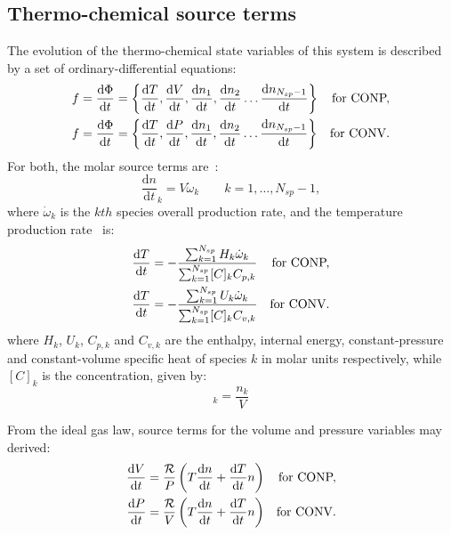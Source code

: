 \documentclass[12pt]{article}
\newcommand{\ns}{N_{sp}}
\newcommand{\conp}{CONP}
\newcommand{\conv}{CONV}
\newcommand{\dconp}{\ifmmode\text{for \conp,}\else for \conp,\fi}
\newcommand{\dconv}{\ifmmode\text{for \conv,}\else for \conv.\fi}
\newcommand{\Ru}{\mathcal{R}}
\begin{document}
\subsection{Thermo-chemical source terms}
The evolution of the thermo-chemical state variables of this system is described by a set of ordinary-differential equations:
\begin{subequations}
\label{e:source_terms}
\begin{align}
f &= \frac{\text{d} \Phi }{\text{d} t } = \left\{\frac{\text{d} T }{\text{d} t },\frac{\text{d} V }{\text{d} t },\frac{\text{d} n_1}{\text{d} t },\frac{\text{d} n_2 }{\text{d} t }\ldots \frac{\text{d} n_{\ns - 1} }{\text{d} t }\right\} & \text{\dconp} \\
f &= \frac{\text{d} \Phi }{\text{d} t } = \left\{\frac{\text{d} T }{\text{d} t },\frac{\text{d} P }{\text{d} t },\frac{\text{d} n_1}{\text{d} t },\frac{\text{d} n_2 }{\text{d} t }\ldots \frac{\text{d} n_{\ns - 1} }{\text{d} t }\right\} & \text{\dconv}
\end{align}
\end{subequations}
For both, the molar source terms are~\cite{TurnsStephenR2012Aitc}:
\begin{equation}
\frac{\text{d} n }{\text{d} t }_{k} = V \dot{\omega}_{k} \qquad k = 1, \ldots, \ns - 1, \label{e:spec}
\end{equation}
where $\dot{\omega}_k$ is the $kth$ species overall production rate, and the temperature production rate~\cite{TurnsStephenR2012Aitc} is:
\begin{subequations}
\label{e:temperature_incomplete}
\begin{align}
\frac{\text{d} T }{\text{d} t } &= - \frac{\sum_{k=1}^{\ns} H_{k} \dot{\omega}_{k}}{\sum_{k=1}^{\ns} [C]_{k} {C_{p, k}}} & \text{\dconp} \\
\frac{\text{d} T }{\text{d} t } &= - \frac{\sum_{k=1}^{\ns} U_{k} \dot{\omega}_{k}}{\sum_{k=1}^{\ns} [C]_{k} {C_{v, k}}} & \text{\dconv}
\end{align}
\end{subequations}
where $H_k$, $U_k$, $C_{p,k}$ and $C_{v, k}$ are the enthalpy, internal energy, constant-pressure and constant-volume specific heat of species $k$ in molar units respectively, while $[C]_{k}$ is the concentration, given by:
\begin{equation}
 [C]_{k} = \frac{n_{k}}{V}
\end{equation}

From the ideal gas law, source terms for the volume and pressure variables may derived:
\begin{subequations}
\label{e:param_incomplete}
\begin{align}
\frac{\text{d} V }{\text{d} t } &= \frac{\Ru}{P} \left(T \frac{\text{d} n }{\text{d} t } + \frac{\text{d} T }{\text{d} t } n\right) & \text{\dconp} \\
\frac{\text{d} P }{\text{d} t } &= \frac{\Ru}{V} \left(T \frac{\text{d} n }{\text{d} t } + \frac{\text{d} T }{\text{d} t } n\right) & \text{\dconv}
\end{align}
\end{subequations}
\end{document}
